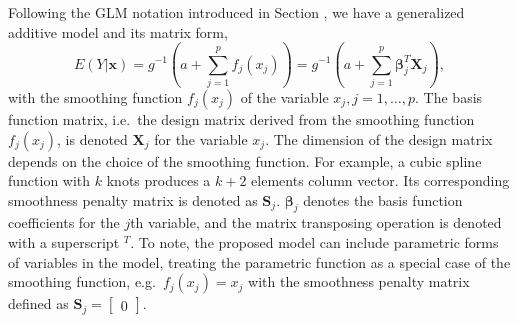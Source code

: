 \documentclass[AMA,STIX1COL,]{WileyNJD-v2}
\begin{document}
Following the GLM notation introduced in Section \label{introduction},
we have a generalized additive model and its matrix form,
\begin{equation}\label{eq:gam}
E(Y|\boldsymbol{x}) = g^{-1}(a + \sum\limits^p_{j=1}f_j(x_j)) = g^{-1}(a + \sum\limits^p_{j=1} \boldsymbol{\beta}_j^T \boldsymbol{X}_j),
\end{equation} with the smoothing function \(f_j(x_j)\) of the variable
\(x_j, j = 1, \dots, p.\) The basis function matrix, i.e.~the design
matrix derived from the smoothing function \(f_j(x_j)\), is denoted
\(\boldsymbol{X}_j\) for the variable \(x_j\). The dimension of the
design matrix depends on the choice of the smoothing function. For
example, a cubic spline function with \(k\) knots produces a \(k+2\)
elements column vector. Its corresponding smoothness penalty matrix is
denoted as \(\boldsymbol{S}_j\). \(\boldsymbol{\beta}_j\) denotes the
basis function coefficients for the \(j\)th variable, and the matrix
transposing operation is denoted with a superscript \(^T\). To note, the
proposed model can include parametric forms of variables in the model,
treating the parametric function as a special case of the smoothing
function, e.g.~\(f_j(x_j) = x_j\) with the smoothness penalty matrix
defined as \(\boldsymbol{S}_j = \begin{bmatrix}0\end{bmatrix}\).
\end{document}
